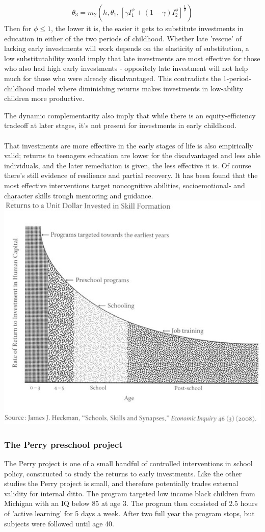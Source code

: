 \documentclass[12pt, a4paper]{article}
\begin{document}
\begin{multicols}{2}
\begin{align*}
\theta_3 = m_2(h, \theta_1, [\gamma I_1^{\phi}+ (1- \gamma)I_2^{\phi} ]^{\frac{1}{\phi}} )
\end{align*}
Then for $\phi \leq 1$, the lower it is, the easier it gets to substitute investments in education in either of the two periods of childhood. Whether late 'rescue' of lacking early investments will work depends on the elasticity of substitution, a low substitutability would imply that late investments are most effective for those who also had high early investments - oppositely late investment will not help much for those who were already disadvantaged. This contradicts the 1-period-childhood model where diminishing returns makes investments in low-ability children more productive. 

The dynamic complementarity also imply that while there is an equity-efficiency tradeoff at later stages, it's not present for investments in early childhood.
\\ \\
That investments are more effective in the early stages of life is also empirically valid; returns to teenagers education are lower for the disadvantaged and less able individuals, and the later remediation is given, the less effective it is. Of course there's still evidence of resilience and partial recovery. It has been found that the most effective interventions target noncognitive abilities, socioemotional- and character skills trough mentoring and guidance. 
\includegraphics[width = 0.5 \textwidth]{returns.jpg}

\subsubsection{The Perry preschool project}
The Perry project is one of a small handful of controlled interventions in school policy, constructed to study the returns to early investments. Like the other studies the Perry project is small, and therefore potentially trades external validity for internal ditto. The program targeted low income black children from Michigan with an IQ below 85 at age 3. The program then consisted of 2.5 hours of 'active learning' for 5 days a week. After two full year the program stops, but subjects were followed until age 40. 


\end{multicols}
\end{document}
